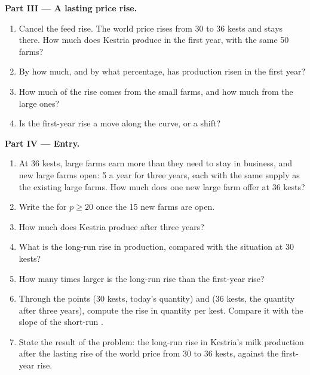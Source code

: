 \begin{problem}
\medskip
\noindent\textbf{Part III --- A lasting price rise.}
\begin{enumerate}[resume]
\item Cancel the feed rise. The world price rises from 30 to 36 kests and stays there. How much does Kestria produce in the first year, with the same
  50 farms?
\item By how much, and by what percentage, has production risen in the first year?
\item How much of the rise comes from the small farms, and how much from the large ones?
\item Is the first-year rise a move along the  curve, or a shift?
\end{enumerate}

\medskip
\noindent\textbf{Part IV --- Entry.}
\begin{enumerate}[resume]
\item At 36 kests, large farms earn more than they need to stay in business, and new large farms open: 5 a year for three years, each with the same
  supply as the existing large farms. How much does one new large farm offer at 36 kests?
\item Write the  for $p \ge 20$ once the 15 new farms are open.
\item How much does Kestria produce after three years?
\item What is the long-run rise in production, compared with the situation at 30 kests?
\item How many times larger is the long-run rise than the first-year rise?
\item Through the points (30 kests, today's quantity) and (36 kests, the quantity after three years), compute the rise in quantity per kest. Compare
  it with the slope of the short-run .
\item State the result of the problem: the long-run rise in Kestria's milk production after the lasting rise of the world price from 30 to 36 kests,
  against the first-year rise.
\end{enumerate}
\end{problem}

